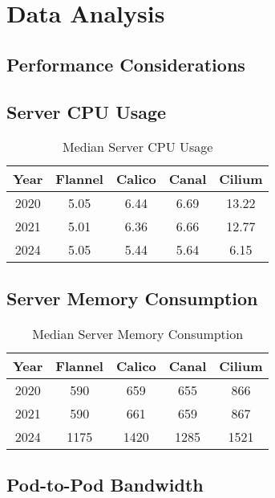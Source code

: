%
%

\pagebreak
\section{Data Analysis}

\onehalfspacing

\subsection{Performance Considerations}

\subsection{Server CPU Usage}

\begin{table}[H]
\caption{Median Server CPU Usage}
\begin{tabular}{|c | c | c | c | c|} 
 \hline
 Year & Flannel & Calico & Canal & Cilium \\
 \hline\hline
 2020 & 5.05 & 6.44 & 6.69 & 13.22 \\ 
 \hline
 2021 & 5.01 & 6.36 & 6.66 & 12.77 \\
 \hline
 2024 & 5.05 & 5.44 & 5.64 & 6.15 \\
 \hline
\end{tabular}
\label{tab:cpu}
\end{table}

\subsection{Server Memory Consumption}

\begin{table}[H]
\caption{Median Server Memory Consumption}
\begin{tabular}{|c | c | c | c | c|} 
 \hline
 Year & Flannel & Calico & Canal & Cilium \\
 \hline\hline
 2020 & 590 & 659 & 655 & 866 \\ 
 \hline
 2021 & 590 & 661 & 659 & 867 \\
 \hline
 2024 & 1175 & 1420 & 1285 & 1521 \\
 \hline
\end{tabular}
\label{tab:mem}
\end{table}

\subsection{Pod-to-Pod Bandwidth}

